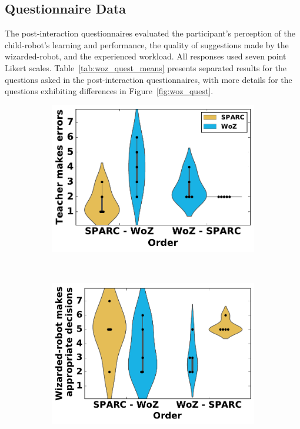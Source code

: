 \subsection{Questionnaire Data}

The post-interaction questionnaires evaluated the participant's perception of the child-robot's learning and performance, the quality of suggestions made by the wizarded-robot, and the experienced workload. All responses used seven point Likert scales. Table~\ref{tab:woz_quest_means} presents separated results for the questions asked in the post-interaction questionnaires, with more details for the questions exhibiting differences in Figure~\ref{fig:woz_quest}.

\begin{figure}[ht]
	\centering
	\begin{subfigure}[t]{0.3295\textwidth}
		\centering
		\includegraphics[width=1.\textwidth]{errors.pdf}
	\end{subfigure}%
	~ 
	\begin{subfigure}[t]{0.341\textwidth}
		\centering
		\includegraphics[width=1.\textwidth]{appropriate.pdf}

\end{subfigure}
\end{figure}
